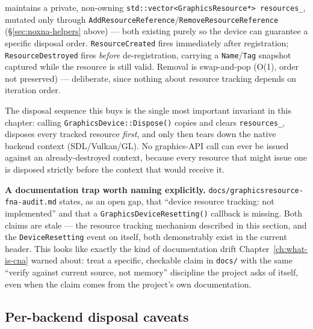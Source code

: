  maintains a private, non-owning
\texttt{std::vector<GraphicsResource*> resources\_}, mutated only through
\texttt{AddResourceReference}/\texttt{RemoveResourceReference} (\S\ref{sec:noxna-helpers} above)
--- both existing purely so the device can guarantee a specific disposal order.
\texttt{ResourceCreated} fires immediately after registration; \texttt{ResourceDestroyed} fires
\emph{before} de-registration, carrying a \texttt{Name}/\texttt{Tag} snapshot captured while the
resource is still valid. Removal is swap-and-pop (O(1), order not preserved) --- deliberate,
since nothing about resource tracking depends on iteration order.

The disposal sequence this buys is the single most important invariant in this chapter: calling
\texttt{GraphicsDevice::Dispose()} copies and clears \texttt{resources\_}, disposes every
tracked resource \emph{first}, and only then tears down the native backend context
(SDL/Vulkan/GL). No graphics-API call can ever be issued against an already-destroyed context,
because every resource that might issue one is disposed strictly before the context that would
receive it.

\begin{sourcenote}
\textbf{A documentation trap worth naming explicitly.} \texttt{docs/graphicsresource-fna-audit.md}
states, as an open gap, that ``device resource tracking: not implemented'' and that a
\texttt{GraphicsDeviceResetting()} callback is missing. Both claims are stale --- the resource
tracking mechanism described in this section, and the \texttt{DeviceResetting} event on
 itself, both demonstrably exist in the current header. This looks
like exactly the kind of documentation drift Chapter~\ref{ch:what-is-cna} warned about: treat a
specific, checkable claim in \texttt{docs/} with the same ``verify against current source, not
memory'' discipline the project asks of itself, even when the claim comes from the project's
own documentation.
\end{sourcenote}

\subsection{Per-backend disposal caveats}

